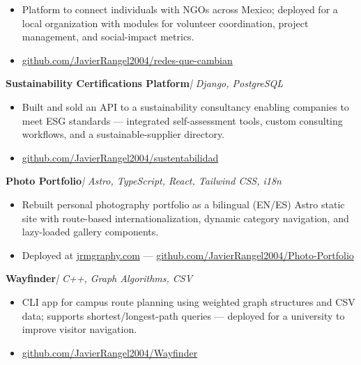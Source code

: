 \documentclass[11pt, letterpaper]{article}
\newenvironment{cvlist}{%
  \begin{itemize}[leftmargin=1.4em,itemsep=1.5pt,topsep=3pt,parsep=0pt]
}{\end{itemize}}
\newcommand{\project}[2]{\noindent\textbf{#1}\hspace{4pt}\textit{| #2}}
\begin{document}
\begin{cvlist}
  \item Platform to connect individuals with NGOs across Mexico; deployed for a
        local organization with modules for volunteer coordination, project
        management, and social-impact metrics.
  \item \href{https://github.com/JavierRangel2004/redes-que-cambian}{github.com/JavierRangel2004/redes-que-cambian}
\end{cvlist}

\vspace{4pt}

\project{Sustainability Certifications Platform}%
        {Django, PostgreSQL}

\begin{cvlist}
  \item Built and sold an API to a sustainability consultancy enabling companies
        to meet ESG standards — integrated self-assessment tools, custom consulting
        workflows, and a sustainable-supplier directory.
  \item \href{https://github.com/JavierRangel2004/sustentabilidad}{github.com/JavierRangel2004/sustentabilidad}
\end{cvlist}

\vspace{4pt}

\project{Photo Portfolio}%
        {Astro, TypeScript, React, Tailwind CSS, i18n}

\begin{cvlist}
  \item Rebuilt personal photography portfolio as a bilingual (EN/ES) Astro static
        site with route-based internationalization, dynamic category navigation, and
        lazy-loaded gallery components.
  \item Deployed at \href{https://jrmgraphy.com}{jrmgraphy.com} —
        \href{https://github.com/JavierRangel2004/Photo-Portfolio}{github.com/JavierRangel2004/Photo-Portfolio}
\end{cvlist}

\vspace{4pt}

\project{Wayfinder}%
        {C++, Graph Algorithms, CSV}

\begin{cvlist}
  \item CLI app for campus route planning using weighted graph structures and CSV
        data; supports shortest/longest-path queries — deployed for a university
        to improve visitor navigation.
  \item \href{https://github.com/JavierRangel2004/Wayfinder}{github.com/JavierRangel2004/Wayfinder}
\end{cvlist}
\end{document}
